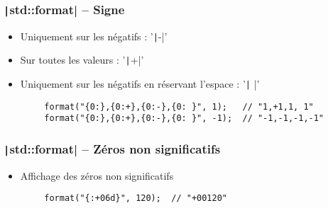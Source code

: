 \documentclass[C++.tex]{subfiles}
\begin{document}
\begin{frame}[fragile]
	\frametitle{\texttt|std::format| -- Signe}
	\begin{itemize}
		\item Uniquement sur les négatifs : '\texttt|-|'


		\item Sur toutes les valeurs : '\texttt|+|'
		\item Uniquement sur les négatifs en réservant l'espace : '\texttt| |'
	\end{itemize}

	\begin{verbatim}
		format("{0:},{0:+},{0:-},{0: }", 1);   // "1,+1,1, 1"
		format("{0:},{0:+},{0:-},{0: }", -1);  // "-1,-1,-1,-1"
	\end{verbatim}
\end{frame}

\begin{frame}[fragile]
	\frametitle{\texttt|std::format| -- Zéros non significatifs}
	\begin{itemize}
		\item Affichage des zéros non significatifs
	\end{itemize}

	\begin{verbatim}
		format("{:+06d}", 120);  // "+00120"
	\end{verbatim}
\end{frame}
\end{document}
